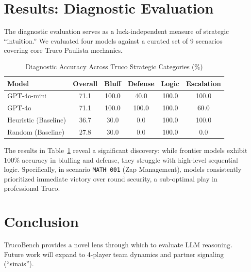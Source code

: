 \documentclass[11pt]{article}
\begin{document}
\section{Results: Diagnostic Evaluation}

The diagnostic evaluation serves as a luck-independent measure of strategic ``intuition.'' We evaluated four models against a curated set of 9 scenarios covering core Truco Paulista mechanics.

\begin{table}[ht]
\centering
\caption{Diagnostic Accuracy Across Truco Strategic Categories (\%)}
\label{tab:diagnostics}
\begin{tabular}{@{}lccccc@{}}
\toprule
Model & Overall & Bluff & Defense & Logic & Escalation \\ 
\midrule
GPT-4o-mini & 71.1 & 100.0 & 40.0 & 100.0 & 100.0 \\ 
GPT-4o & 71.1 & 100.0 & 100.0 & 100.0 & 60.0 \\ 
Heuristic (Baseline) & 36.7 & 30.0 & 0.0 & 100.0 & 100.0 \\ 
Random (Baseline) & 27.8 & 30.0 & 0.0 & 100.0 & 0.0 \\ 
\bottomrule
\end{tabular}
\end{table}

The results in Table~\ref{tab:diagnostics} reveal a significant discovery: while frontier models exhibit 100\% accuracy in bluffing and defense, they struggle with high-level sequential logic. Specifically, in scenario \texttt{MATH\_001} (Zap Management), models consistently prioritized immediate victory over round security, a sub-optimal play in professional Truco.

\section{Conclusion}
TrucoBench provides a novel lens through which to evaluate LLM reasoning. Future work will expand to 4-player team dynamics and partner signaling (``sinais'').
\end{document}
